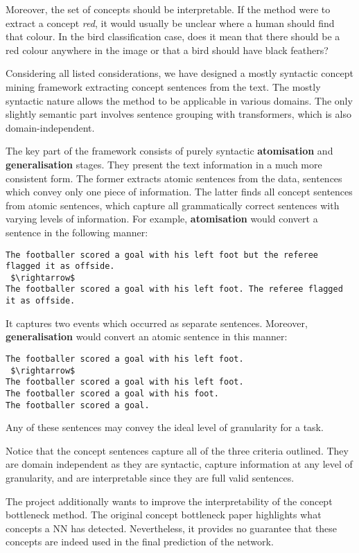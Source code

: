 Moreover, the set of concepts should be interpretable.
If the method were to extract a concept \emph{red}, it would usually be unclear where a human should find that colour.
In the bird classification case, does it mean that there should be a red colour anywhere in the image or that a bird should have black feathers?

Considering all listed considerations, we have designed a mostly syntactic concept mining framework extracting concept sentences from the text.
The mostly syntactic nature allows the method to be applicable in various domains.
The only slightly semantic part involves sentence grouping with transformers, which is also domain-independent. 

The key part of the framework consists of purely syntactic \textbf{atomisation} and \textbf{generalisation} stages.
They present the text information in a much more consistent form.
The former extracts atomic sentences from the data, sentences which convey only one piece of information.
The latter finds all concept sentences from atomic sentences, which capture all grammatically correct sentences with varying levels of information.
For example, \textbf{atomisation} would convert a sentence in the following manner:
\begin{lstlisting}
The footballer scored a goal with his left foot but the referee flagged it as offside.
 $\rightarrow$
The footballer scored a goal with his left foot. The referee flagged it as offside.
\end{lstlisting}
It captures two events which occurred as separate sentences.
Moreover, \textbf{generalisation} would convert an atomic sentence in this manner:
\begin{lstlisting}
The footballer scored a goal with his left foot.
 $\rightarrow$
The footballer scored a goal with his left foot. 
The footballer scored a goal with his foot. 
The footballer scored a goal.
\end{lstlisting}
Any of these sentences may convey the ideal level of granularity for a task.

Notice that the concept sentences capture all of the three criteria outlined. 
They are domain independent as they are syntactic, capture information at any level of granularity, and are interpretable since they are full valid sentences.


The project additionally wants to improve the interpretability of the concept bottleneck method.
The original concept bottleneck paper \cite{RefWorks:RefID:35-koh2020concept} highlights what concepts a NN has detected.
Nevertheless, it provides no guarantee that these concepts are indeed used in the final prediction of the network.

